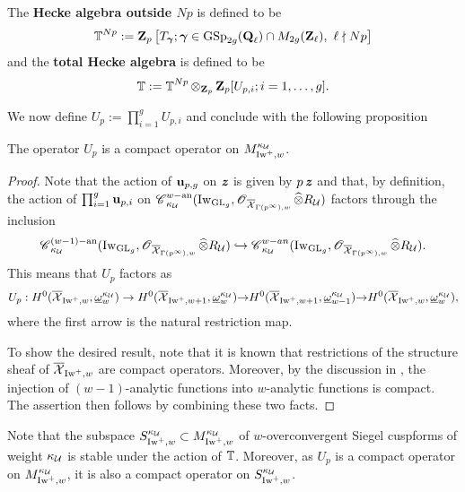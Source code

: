 \begin{Definition}\label{Definition: Hecke algebra}
The \textbf{Hecke algebra outside $Np$} is defined to be
$$\bbT^{Np}:=\Z_p\left[T_{\bfgamma};  \bfgamma\in \GSp_{2g}(\Q_{\ell})\cap M_{2g}(\Z_{\ell}), \,\,\ell\nmid Np\right]$$
and the \textbf{total Hecke algebra} is defined to be
$$\bbT:= \bbT^{Np}\otimes_{\Z_p}\Z_p[U_{p,i}; i=1, \ldots, g].$$
\end{Definition}
We now define  $U_{p}:=\prod_{i=1}^{g}U_{p,i}$ and conclude with the following proposition
\begin{Proposition} The operator $U_p$  is a compact operator on $M_{\Iw^+, w}^{\kappa_{\calU}}$. 
\end{Proposition}
\begin{proof}
Note that the action of $\bfu_{p,g} $ on $\bfitz$ is given by $p \bfitz$ and that, by definition, the action of $\prod_{i=1}^{g}\bfu_{p,i}$ on $ \scrC^{w-\an}_{\kappa_{\calU}}(\Iw_{\GL_g}, \scrO_{\overline{\calX}_{\Gamma(p^{\infty}),w}}\widehat{\otimes}R_{\calU})$ factors through the inclusion  \[
 \scrC^{(w-1)-\an}_{\kappa_{\calU}}(\Iw_{\GL_g}, \scrO_{\overline{\calX}_{\Gamma(p^{\infty}),w}}\widehat{\otimes}R_{\calU}) \hookrightarrow \scrC_{\kappa_{\calU}}^{w-an}(\Iw_{\GL_g}, \scrO_{\overline{\calX}_{\Gamma(p^{\infty}), w}}\widehat{\otimes}R_{\calU}).
\]  This means that $U_{p}$ factors as 
\[
U_{p}: H^0(\overline{\calX}_{\Iw^+,w}, \underline{\omega}^{\kappa_{\calU}}_w)\rightarrow H^0(\overline{\calX}_{\Iw^+,w+1}, \underline{\omega}^{\kappa_{\calU}}_w){\rightarrow}   H^0(\overline{\calX}_{\Iw^+,w+1}, \underline{\omega}^{\kappa_{\calU}}_{w-1}){\rightarrow} H^0(\overline{\calX}_{\Iw^+,w}, \underline{\omega}^{\kappa_{\calU}}_w),
\]
where the first arrow is the natural restriction map. 

To show the desired result, note that it is known that restrictions of the structure sheaf of $\overline{\calX}_{\Iw^+,w}$ are compact operators. Moreover, by the discussion in \cite[\S 2.2]{Hansen-PhD}, the injection of $(w-1)$-analytic functions into $w$-analytic functions is compact. The assertion then follows by combining these two facts.
\end{proof}

\begin{Remark}\label{Remark: cuspforms are stable under Hecke actions}
\normalfont Note that the subspace $S_{\Iw^+, w}^{\kappa_{\calU}}\subset M_{\Iw^+, w}^{\kappa_{\calU}}$ of $w$-overconvergent Siegel cuspforms of weight $\kappa_{\calU}$ is stable under the action of $\bbT$. Moreover, as $U_p$ is a compact operator on $M_{\Iw^+, w}^{\kappa_{\calU}}$, it is also a compact operator on $S_{\Iw^+, w}^{\kappa_{\calU}}$.
\end{Remark}



